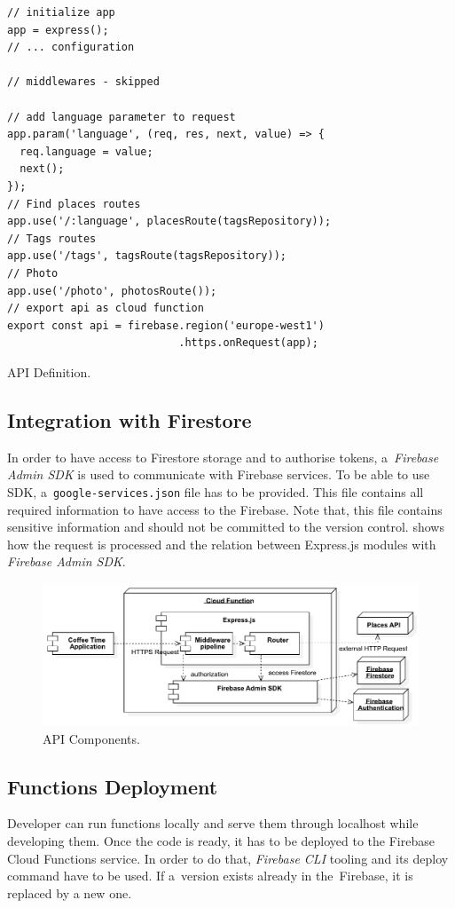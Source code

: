 \begin{listing}[ht]
\begin{verbatim}
// initialize app
app = express();
// ... configuration

// middlewares - skipped

// add language parameter to request
app.param('language', (req, res, next, value) => {
  req.language = value;
  next();
});
// Find places routes
app.use('/:language', placesRoute(tagsRepository));
// Tags routes
app.use('/tags', tagsRoute(tagsRepository));
// Photo
app.use('/photo', photosRoute());
// export api as cloud function
export const api = firebase.region('europe-west1')
                           .https.onRequest(app);
\end{verbatim}
\caption{API Definition.}
\label{listing:cta-index}
\end{listing}

\subsection{Integration with Firestore}
In order to have access to Firestore storage and to authorise tokens, a~\textit{Firebase Admin SDK} is used to communicate with Firebase services. To be able to use SDK, a~\verb|google-services.json| file has to be provided. This file contains all required information to have access to the Firebase. Note that, this file contains sensitive information and should not be committed to the version control.  shows how the request is processed and the relation between Express.js modules with \textit{Firebase Admin SDK}.

\begin{figure}[ht]
    \centering
    \includegraphics[width=\linewidth]{img/implementation/coffee-api-components.pdf}
    \caption{API Components.}
    \label{fig:cta-relations}
\end{figure}

\subsection{Functions Deployment}
Developer can run functions locally and serve them through localhost while developing them. Once the code is ready, it has to be deployed to the Firebase Cloud Functions service. In order to do that, \textit{Firebase CLI} tooling and its deploy command have to be used. If a~version exists already in the~Firebase, it is replaced by a new one.

